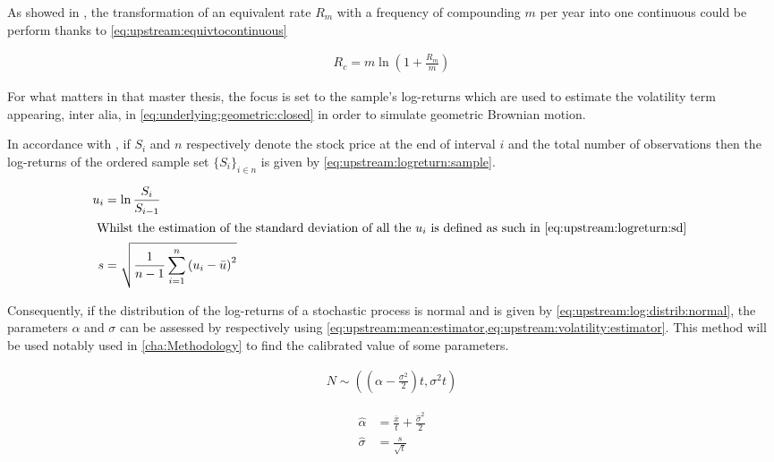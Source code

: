 \documentclass[12pt,a4paper]{report}
\begin{document}
As showed in \citet{hull}, the transformation of an equivalent rate $R_m$ with a frequency of compounding $m$ per year into one continuous could be perform thanks to \cref{eq:upstream:equivtocontinuous}

\begin{align}
R_c = m \ln \left( 1 + \frac{R_m}{m} \right) \label{eq:upstream:equivtocontinuous}
\end{align}

For what matters in that master thesis, the focus is set to the sample's log-returns which are used to estimate the volatility term appearing, inter alia, in \cref{eq:underlying:geometric:closed} in order to simulate geometric Brownian motion.

In accordance with \citet{hull}, if $S_i$ and $n$ respectively denote the stock price at the end of interval $i$ and the total number of observations then the log-returns of the ordered sample set $\{S_i\}_{i \in n}$ is given by \cref{eq:upstream:logreturn:sample}.

\begin{align}
  u_i &= \ln \frac{S_i}{S_{i-1}} \label{eq:upstream:logreturn:sample} \\
  \intertext{
  Whilst the estimation of the standard deviation of all the $u_i$ is defined as such in \cref{eq:upstream:logreturn:sd}
  }
  s &= \sqrt{\frac{1}{n - 1} \sum_{i = 1}^n \left(u_i - \bar{u} \right) ^2} \label{eq:upstream:logreturn:sd}
\end{align}

Consequently, if the distribution of the log-returns of a stochastic process is normal and is given by \cref{eq:upstream:log:distrib:normal}, the parameters $\alpha$ and $\sigma$ can be assessed by respectively using \cref{eq:upstream:mean:estimator,eq:upstream:volatility:estimator}.
This method will be used notably used in \cref{cha:Methodology} to find the calibrated value of some parameters.

\begin{align}
  N \sim \left( \left( \alpha - \frac{\sigma^ 2}{2} \right) t, \sigma^2 t \right) \label{eq:upstream:log:distrib:normal}
\end{align}

\begin{align}
  \hat{\alpha} &= \frac{\bar{x}}{t} + \frac{\hat{\sigma}^2}{2} \label{eq:upstream:mean:estimator}\\
  \hat{\sigma} &= \frac{s}{\sqrt{t}} \label{eq:upstream:volatility:estimator}
\end{align}
\end{document}
